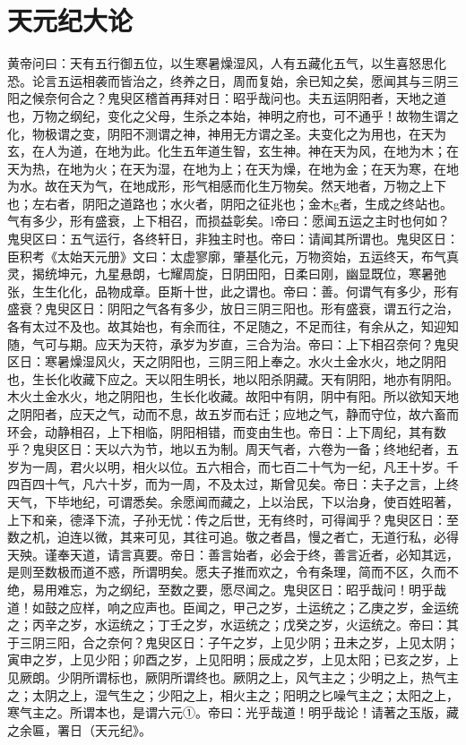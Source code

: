 \documentclass[a4paper,12pt,UTF8,twoside]{ctexbook}
\begin{document}
\chapter{天元纪大论}
黄帝问曰：天有五行御五位，以生寒暑燥湿风，人有五藏化五气，以生喜怒思化恐。论言五运相袭而皆治之，终养之日，周而复始，余已知之矣，愿闻其与三阴三阳之候奈何合之？鬼臾区稽首再拜对日：昭乎哉问也。夫五运阴阳者，天地之道也，万物之纲纪，变化之父母，生杀之本始，神明之府也，可不通乎！故物生谓之化，物极谓之变，阴阳不测谓之神，神用无方谓之圣。夫变化之为用也，在天为玄，在人为道，在地为此。化生五年道生智，玄生神。神在天为风，在地为木；在天为热，在地为火；在天为湿，在地为上；在天为燥，在地为金；在天为寒，在地为水。故在天为气，在地成形，形气相感而化生万物矣。然天地者，万物之上下也；左右者，阴阳之道路也；水火者，阴阳之征兆也；金木g者，生成之终站也。气有多少，形有盛衰，上下相召，而损益彰矣。l帝曰：愿闻五运之主时也何如？鬼臾区曰：五气运行，各终轩日，非独主时也。帝曰：请闻其所谓也。鬼臾区日：臣积考《太始天元册》文曰：太虚寥廓，肇基化元，万物资始，五运终天，布气真灵，揭统坤元，九星悬朗，七耀周旋，日阴田阳，日柔曰刚，幽显既位，寒暑弛张，生生化化，品物成章。臣斯十世，此之谓也。帝曰：善。何谓气有多少，形有盛衰？鬼臾区日：阴阳之气各有多少，放日三阴三阳也。形有盛衰，谓五行之治，各有太过不及也。故其始也，有余而往，不足随之，不足而往，有余从之，知迎知随，气可与期。应天为天符，承岁为岁直，三合为治。帝曰：上下相召奈何？鬼臾区日：寒暑燥湿风火，天之阴阳也，三阴三阳上奉之。水火土金水火，地之阴阳也，生长化收藏下应之。天以阳生明长，地以阳杀阴藏。天有阴阳，地亦有阴阳。木火土金水火，地之阴阳也，生长化收藏。故阳中有阴，阴中有阳。所以欲知天地之阴阳者，应天之气，动而不息，故五岁而右迁；应地之气，静而守位，故六畜而环会，动静相召，上下相临，阴阳相错，而变由生也。帝日：上下周纪，其有数乎？鬼臾区日：天以六为节，地以五为制。周天气者，六卷为一备；终地纪者，五岁为一周，君火以明，相火以位。五六相合，而七百二十气为一纪，凡王十岁。千四百四十气，凡六十岁，而为一周，不及太过，斯曾见矣。帝日：夫子之言，上终天气，下毕地纪，可谓悉矣。余愿闻而藏之，上以治民，下以治身，使百姓昭著，上下和亲，德泽下流，子孙无忧：传之后世，无有终时，可得闻乎？鬼臾区日：至数之机，迫连以微，其来可见，其往可追。敬之者昌，慢之者亡，无道行私，必得天殃。谨奉天道，请言真要。帝日：善言始者，必会于终，善言近者，必知其远，是则至数极而道不惑，所谓明矣。愿夫子推而欢之，令有条理，简而不区，久而不绝，易用难忘，为之纲纪，至数之要，愿尽闻之。鬼臾区日：昭乎哉问！明乎哉道！如鼓之应样，响之应声也。臣闻之，甲己之岁，土运统之；乙庚之岁，金运统之；丙辛之岁，水运统之；丁壬之岁，水运统之；戊癸之岁，火运统之。帝曰：其于三阴三阳，合之奈何？鬼臾区日：子午之岁，上见少阴；丑未之岁，上见太阴；寅申之岁，上见少阳；卯酉之岁，上见阳明；辰成之岁，上见太阳；已亥之岁，上见厥朗。少阴所谓标也，厥阴所谓终也。厥阴之上，风气主之；少明之上，热气主之；太阴之上，湿气生之；少阳之上，相火主之；阳明之匕噪气主之；太阳之上，寒气主之。所谓本也，是谓六元①。帝曰：光乎哉道！明乎哉论！请著之玉版，藏之余匾，署日（天元纪》。
\end{document}

